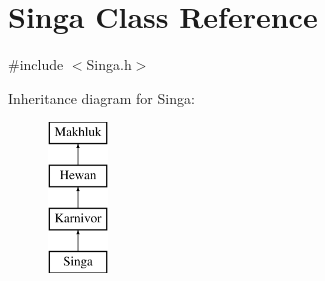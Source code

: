 \hypertarget{class_singa}{}\section{Singa Class Reference}
\label{class_singa}


{\ttfamily \#include $<$Singa.\+h$>$}

Inheritance diagram for Singa\+:\begin{figure}[H]
\begin{center}
\leavevmode
\includegraphics[height=4.000000cm]{class_singa}
\end{center}
\end{figure}
